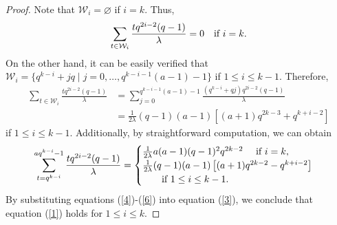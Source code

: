 \documentclass[journal,onecolumn]{IEEEtran}
\begin{document}
\begin{proof}
Note that   $\mathcal{W}_i=\varnothing$ if  $i=k$.   Thus,  
 \begin{equation}\label{4}
 \sum\limits_{t\in \mathcal{W}_i}\frac{tq^{2i-2}(q-1)}{\lambda}=0 \quad \hbox{if } i=k.
 \end{equation} 
On the other hand, it can be easily verified that    
$\mathcal{W}_i =\{q^{k-i}+ j q \mid j =0,\ldots, q^{k-i-1}(a-1)-1\}$  if  $1\leq i \leq  k-1.$
Therefore, 
 \begin{equation}\label{5}
 \begin{split}
\sum\limits_{t\in \mathcal{W}_i}\frac{tq^{2i-2}(q-1)}{\lambda}
& = \sum\limits_{j=0}^{q^{k-i-1}(a-1)-1}\frac{(q^{k-i}+ qj )q^{2i-2}(q-1)}{\lambda} \\
& = \frac{1}{2\lambda}(q-1)(a-1)\left[(a+1)q^{2k-3}+q^{k+i-2}\right] 
 \end{split}
\end{equation} if $1\leq i\leq k-1$. 
Additionally, by straightforward computation, 
we can obtain 
\begin{equation}\label{6}
\begin{aligned}
\sum\limits_{t=q^{k-i}}^{aq^{k-i}-1}\frac{tq^{2i-2}(q-1)}{\lambda} 
 =\begin{cases}\frac{1}{2\lambda}a(a-1)(q-1)^2q^{2k-2} \quad  \hbox{ if } i=k,\\
 \frac{1}{2\lambda}(q-1)(a-1)\left[(a+1)q^{2k-2}-q^{k+i-2}\right] \\
 \quad \quad \hbox{if }1\leq i\leq k-1.
 \end{cases}\end{aligned}
\end{equation}
By substituting equations (\ref{4})-(\ref{6}) into equation (\ref{3}), we conclude that equation (\ref{1}) holds for  $1\leq i\leq k$. 



\end{proof}
\end{document}
